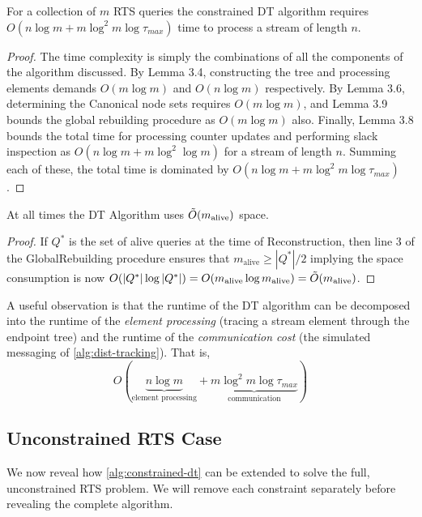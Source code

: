\begin{theorem} For a collection of $m$ RTS queries the constrained DT algorithm requires $O(n\log m + m\log^2m\log\tau_{max})$ time to process a stream of length $n$.
\end{theorem}
\begin{proof}
    The time complexity is simply the combinations of all the components of the algorithm discussed. By Lemma 3.4, constructing the tree and processing elements demands $O(m\log m)$ and $O(n\log m)$ respectively. By Lemma 3.6, determining the Canonical node sets requires $O(m\log m)$, and Lemma 3.9 bounds the global rebuilding procedure as $O(m\log m)$ also. Finally, Lemma 3.8 bounds the total time for processing counter updates and performing slack inspection as $O(n\log m + m\log^2\log m)$ for a stream of length $n$. Summing each of these, the total time is dominated by $O(n\log m + m\log^2m\log\tau_{max})$.
\end{proof}

\begin{theorem}
    At all times the DT Algorithm uses $\Tilde{O}(m_{\text{alive}})$ space.
\end{theorem}
\begin{proof}
    If $Q^*$ is the set of alive queries at the time of Reconstruction, then line 3 of the GlobalRebuilding procedure ensures that $m_{\text{alive}}\geq |Q^*|/2$ implying the space consumption is now $O(|Q^*|\log |Q^*|) = O(m_{\text{alive}}\log m_{\text{alive}}) = \Tilde{O}(m_{\text{alive}})$.
\end{proof}

A useful observation is that the runtime of the DT algorithm can be decomposed into the runtime of the \textit{element processing} (tracing a stream element through the endpoint tree) and the runtime of the \textit{communication cost} (the simulated messaging of \cref{alg:dist-tracking}). That is, 
$$O(\underbrace{n\log m}_{\text{element processing}} + \underbrace{m\log ^2 m\log\tau_{max}}_{\text{communication}})$$


\subsection{Unconstrained RTS Case}
\label{ssec:unconstrained-DT-algorithm}

We now reveal how \cref{alg:constrained-dt} can be extended to solve the full, unconstrained RTS problem. We will remove each constraint separately before revealing the complete algorithm. 

